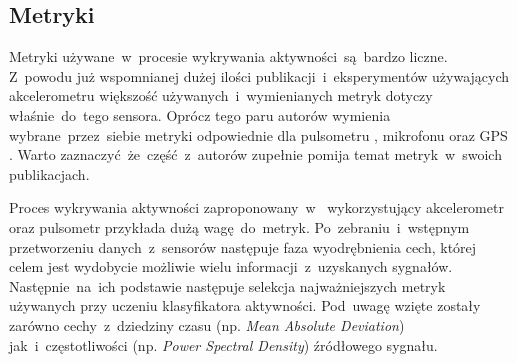 \subsection{Metryki}
Metryki używane~w~procesie wykrywania aktywności~są~bardzo liczne. Z~powodu już wspomnianej dużej ilości publikacji~i~eksperymentów używających akcelerometru większość używanych~i~wymienianych metryk dotyczy właśnie~do~tego sensora. Oprócz tego paru autorów wymienia wybrane~przez~siebie metryki odpowiednie dla pulsometru \cite{S04}, mikrofonu \cite{S22, S46} oraz GPS \cite{S26}. Warto zaznaczyć~że~część~z~autorów zupełnie pomija temat metryk~w~swoich publikacjach.


Proces wykrywania aktywności zaproponowany~w~\cite{S04} wykorzystujący akcelerometr oraz pulsometr przykłada dużą wagę~do~metryk. Po~zebraniu~i~wstępnym przetworzeniu danych~z~sensorów następuje faza wyodrębnienia cech, której celem jest wydobycie możliwie wielu informacji~z~uzyskanych sygnałów. Następnie~na~ich podstawie następuje selekcja najważniejszych metryk używanych przy uczeniu klasyfikatora aktywności. Pod~uwagę wzięte zostały zarówno cechy~z~dziedziny czasu (np. {\it Mean Absolute Deviation}) jak~i~częstotliwości (np. {\it Power Spectral Density}) źródłowego sygnału.


